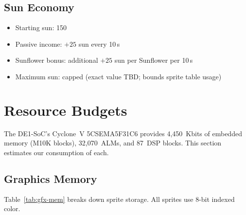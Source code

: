 \documentclass[11pt,letterpaper]{article}
\begin{document}
\subsection{Sun Economy}

\begin{itemize}[nosep]
  \item Starting sun: 150
  \item Passive income: $+25$ sun every 10\,s
  \item Sunflower bonus: additional $+25$ sun per Sunflower per 10\,s
  \item Maximum sun: capped (exact value TBD; bounds sprite table usage)
\end{itemize}

\section{Resource Budgets}
\label{sec:resources}

The DE1-SoC's Cyclone~V 5CSEMA5F31C6 provides 4{,}450~Kbits of embedded
memory (M10K blocks), 32{,}070~ALMs, and 87~DSP blocks. This section
estimates our consumption of each.

\subsection{Graphics Memory}

Table~\ref{tab:gfx-mem} breaks down sprite storage. All sprites use
8-bit indexed color.
\end{document}
